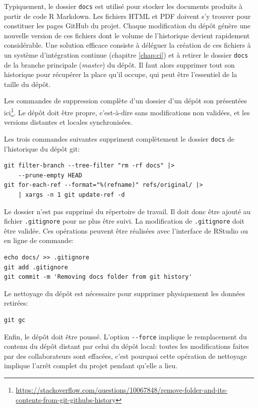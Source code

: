 \documentclass[
  11pt,
  french,
  a4paper,
  extrafontsizes,onecolumn,openright
  ]{memoir}
\begin{document}
Typiquement, le dossier \texttt{docs} est utilisé pour stocker les documents produits à partir de code R Markdown.
Les fichiers HTML et PDF doivent s'y trouver pour constituer les pages GitHub du projet.
Chaque modification du dépôt génère une nouvelle version de ces fichiers dont le volume de l'historique devient rapidement considérable.
Une solution efficace consiste à déléguer la création de ces fichiers à un système d'intégration continue (chapitre \ref{chap:ci}) et à retirer le dossier \texttt{docs} de la branche principale (\emph{master}) du dépôt.
Il faut alors supprimer tout son historique pour récupérer la place qu'il occupe, qui peut être l'essentiel de la taille du dépôt.

Les commandes de suppression complète d'un dossier d'un dépôt son présentées ici\footnote{\url{https://stackoverflow.com/questions/10067848/remove-folder-and-its-contents-from-git-githubs-history}}.
Le dépôt doit être propre, c'est-à-dire sans modifications non validées, et les versions distantes et locales synchronisées.

Les trois commandes suivantes suppriment complètement le dossier \texttt{docs} de l'historique du dépôt git:

\begin{verbatim}
git filter-branch --tree-filter "rm -rf docs" |>
    --prune-empty HEAD
git for-each-ref --format="%(refname)" refs/original/ |>
    | xargs -n 1 git update-ref -d
\end{verbatim}

Le dossier n'est pas supprimé du répertoire de travail.
Il doit donc être ajouté au fichier \texttt{.gitignore} pour ne plus être suivi.
La modification de \texttt{.gitignore} doit être validée.
Ces opérations peuvent être réalisées avec l'interface de RStudio ou en ligne de commande:

\begin{verbatim}
echo docs/ >> .gitignore
git add .gitignore
git commit -m 'Removing docs folder from git history'
\end{verbatim}

Le nettoyage du dépôt est nécessaire pour supprimer physiquement les données retirées:

\begin{verbatim}
git gc
\end{verbatim}

Enfin, le dépôt doit être poussé.
L'option \texttt{-\/-force} implique le remplacement du contenu du dépôt distant par celui du dépôt local: toutes les modifications faites par des collaborateurs sont effacées, c'est pourquoi cette opération de nettoyage implique l'arrêt complet du projet pendant qu'elle a lieu.
\end{document}
